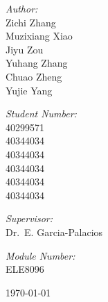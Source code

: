 \begin{titlepage}
\begin{center}
    \begin{minipage}{0.4\textwidth}
        \begin{flushleft} \large
            \emph{Author:}\\
            Zichi Zhang\\
            Muzixiang Xiao\\
            Jiyu Zou\\
            Yuhang Zhang\\
            Chuao Zheng\\
            Yujie Yang
        \end{flushleft}
    \end{minipage}
    \begin{minipage}{0.4\textwidth}
        \begin{flushright} \large
            \emph{Student Number:} \\
            40299571\\
            40344034\\
            40344034\\
            40344034\\
            40344034\\
            40344034
        \end{flushright}
    \end{minipage}\vspace{1cm}
    \begin{minipage}{0.4\textwidth}
        \begin{flushleft} \large
            \emph{Supervisor:}\\
            Dr.~E. Garcia-Palacios
        \end{flushleft}
    \end{minipage}
    \begin{minipage}{0.4\textwidth}
        \begin{flushright} \large
            \emph{Module Number:} \\
            ELE8096
        \end{flushright}
    \end{minipage}

    \vfill
    
    {\large \today}
    
    \end{center}
    
    \end{titlepage}